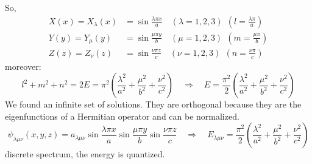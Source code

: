 \documentclass{article}
\begin{document}
So,
\begin{align}
    X(x) = X_\lambda (x) &= \sin \frac{\lambda \pi x}{a} \quad (\lambda = 1, 2, 3) \ \ \left( l = \frac{\lambda \pi}{a} \right)\\
    Y(y) = Y_\mu (y) &= \sin \frac{\mu \pi y}{b} \quad (\mu = 1, 2, 3) \ \ \left( m = \frac{\mu \pi}{b} \right)\\
    Z(z) = Z_\nu (z) &= \sin \frac{\nu \pi z}{c} \quad (\nu = 1, 2, 3) \ \ \left( n = \frac{\nu \pi}{c} \right)
\end{align}
moreover:
\begin{equation}
    l^2 + m^2 + n^2 = 2E = \pi^2 \left( \frac{\lambda^2}{a^2} + \frac{\mu^2}{b^2} + \frac{\nu^2}{c^2} \right) \quad \Rightarrow \quad E = \frac{\pi^2}{2} \left( \frac{\lambda^2}{a^2} + \frac{\mu^2}{b^2} + \frac{\nu^2}{c^2} \right)
\end{equation}
We found an infinite set of solutions. They are orthogonal because they are the eigenfunctions of a Hermitian operator and can be normalized.
\begin{equation}
    \psi_{\lambda \mu \nu} (x,y,z) = a_{\lambda \mu \nu} \sin \frac{\lambda \pi x}{a} \sin \frac{\mu \pi y}{b} \sin \frac{\nu \pi z}{c} \quad \Rightarrow \quad E_{\lambda \mu \nu} = \frac{\pi^2}{2} \left( \frac{\lambda^2}{a^2} + \frac{\mu^2}{b^2} + \frac{\nu^2}{c^2} \right)
\end{equation}
discrete spectrum, the energy is quantized.
\end{document}
